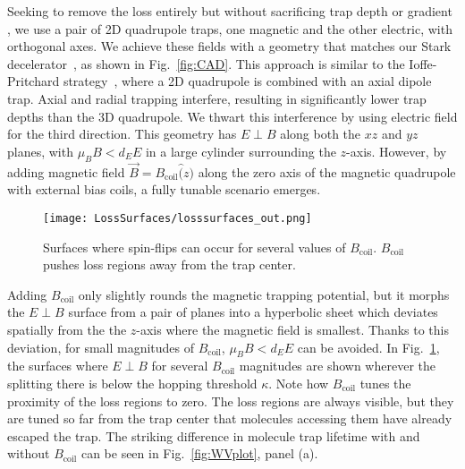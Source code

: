 \documentclass[%
 reprint,
groupedaddress,
 amsmath,amssymb,
 aps,
prl,
]{revtex4-1}
\newcommand{\epb}{{$E\!\perp\!B$}}
\begin{document}
Seeking to remove the loss entirely but without sacrificing trap depth or gradient , we use a pair of 2D quadrupole traps, one magnetic and the other electric, with orthogonal axes. We achieve these fields with a geometry that matches our Stark decelerator~\cite{Bochinski2003}, as shown in Fig.~\ref{fig:CAD}. This approach is similar to the Ioffe-Pritchard strategy~\cite{pritchard1983}, where a 2D quadrupole is combined with an axial dipole trap. Axial and radial trapping interfere, resulting in significantly lower trap depths than the 3D quadrupole. We thwart this interference by using electric field for the third direction. This geometry has \epb{} along both the $xz$ and $yz$ planes, with $\mu_BB < d_EE$ in a large cylinder surrounding the $z$-axis. However, by adding magnetic field $\vec{B}=B_\text{coil}\hat(z)$ along the zero axis of the magnetic quadrupole with external bias coils, a fully tunable scenario emerges. %


\begin{figure}[tb]
\texttt{[image: LossSurfaces/losssurfaces\_out.png]}%
\caption{
Surfaces where spin-flips can occur for several values of $B_\text{coil}$. $B_\text{coil}$ pushes loss regions away from the trap center.
\label{fig:LSurfs}}
\end{figure}

Adding $B_\text{coil}$ only slightly rounds the magnetic trapping potential, but it morphs the \epb{} surface from a pair of planes into a hyperbolic sheet which deviates spatially from the the $z$-axis where the magnetic field is smallest. Thanks to this deviation, for small magnitudes of $B_\text{coil}$, $\mu_BB< d_EE$ can be avoided. In Fig.~\ref{fig:LSurfs}, the surfaces where \epb{} for several $B_\text{coil}$ magnitudes are shown wherever the splitting there is below the hopping threshold $\kappa$. Note how $B_\text{coil}$ tunes the proximity of the loss regions to zero. The loss regions are always visible, but they are tuned so far from the trap center that molecules accessing them have already escaped the trap. The striking difference in molecule trap lifetime with and without $B_\text{coil}$ can be seen in Fig.~\ref{fig:WVplot}, panel (a).
\end{document}
